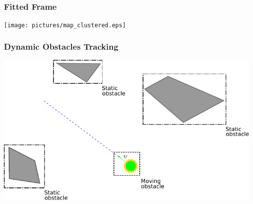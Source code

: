 \begin{frame}
\begin{columns}[T]
{\begin{column}{0.32\textwidth}
			\end{column}
			}
		\end{columns}
	\end{frame}

	\begin{frame}
		\frametitle{Fitted Frame}
		\centering
		\texttt{[image: pictures/map\_clustered.eps]}
	\end{frame}

	\begin{frame}
		\frametitle{Dynamic Obstacles Tracking}
		\centering
		\includegraphics[scale=0.7]{pictures/robot_env_diff.pdf}
	\end{frame}

